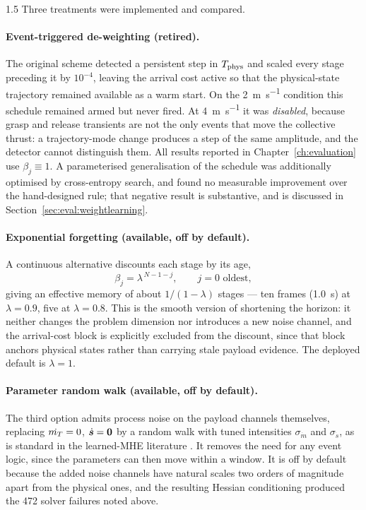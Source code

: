 \begin{spacing}{1.5}
Three treatments were implemented and compared.

\paragraph{Event-triggered de-weighting (retired).} The original scheme detected a
persistent step in $T_{\mathrm{phys}}$ and scaled every stage preceding it by $10^{-4}$,
leaving the arrival cost active so that the physical-state trajectory remained
available as a warm start. On the \SI{2}{\meter\per\second} condition this
schedule remained armed but never fired. At \SI{4}{\meter\per\second} it was
\emph{disabled}, because grasp and release transients are not the only events
that move the collective thrust: a trajectory-mode change produces a step of the
same amplitude, and the detector cannot distinguish them. All results reported in
Chapter~\ref{ch:evaluation} use $\beta_j\equiv1$. A parameterised generalisation
of the schedule was additionally optimised by cross-entropy search, and found no
measurable improvement over the hand-designed rule; that negative result is
substantive, and is discussed in Section~\ref{sec:eval:weightlearning}.

\paragraph{Exponential forgetting (available, off by default).} A continuous
alternative discounts each stage by its age,
\begin{equation}
\beta_j = \lambda^{\,N-1-j}, \qquad j=0 \text{ oldest},
\label{eq:forget}
\end{equation}
giving an effective memory of about $1/(1-\lambda)$ stages --- ten frames
(\SI{1.0}{\second}) at $\lambda=0.9$, five at $\lambda=0.8$. This is the smooth
version of shortening the horizon: it neither changes the problem dimension nor
introduces a new noise channel, and the arrival-cost block is explicitly excluded
from the discount, since that block anchors physical states rather than carrying
stale payload evidence. The deployed default is $\lambda=1$.

\paragraph{Parameter random walk (available, off by default).} The third option
admits process noise on the payload channels themselves, replacing
$\dot{m_T}=0$, $\dot{\bm{s}}=\bm 0$ by a random walk with tuned intensities
$\sigma_{\dot m}$ and $\sigma_{\dot s}$, as is standard in the learned-MHE
literature \cite{neuromhe}. It removes the need for any event logic, since the
parameters can then move within a window. It is off by default because the added
noise channels have natural scales two orders of magnitude apart from the
physical ones, and the resulting Hessian conditioning produced the 472 solver
failures noted above.


\end{spacing}
